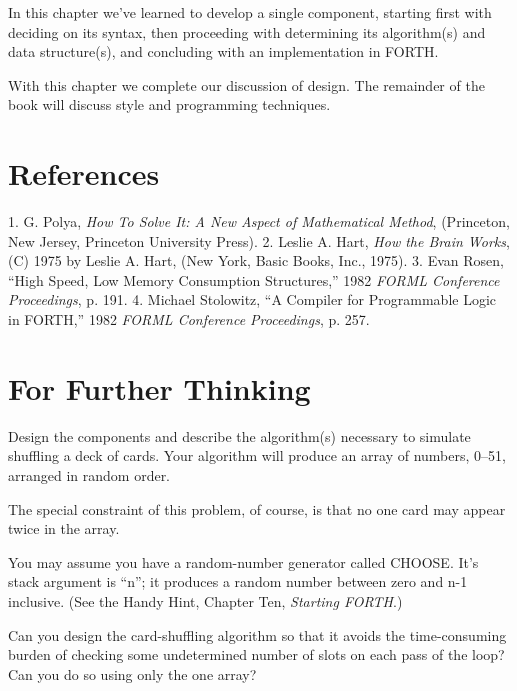 In this chapter we've learned to develop a single component, starting
first with deciding on its syntax, then proceeding with determining its
algorithm(s) and data structure(s), and concluding with an implementation
in FORTH.

With this chapter we complete our discussion of design. The remainder
of the book will discuss style and programming techniques.

\section{References}

1. G. Polya, \emph{How To Solve It: A New Aspect of Mathematical Method},
   (Princeton, New Jersey, Princeton University Press).
2. Leslie A. Hart, \emph{How the Brain Works}, (C) 1975 by Leslie A. Hart,
   (New York, Basic Books, Inc., 1975).
3. Evan Rosen, ``High Speed, Low Memory Consumption Structures,'' 1982
   \emph{FORML Conference Proceedings}, p. 191.
4. Michael Stolowitz, ``A Compiler for Programmable Logic in FORTH,'' 1982
   \emph{FORML Conference Proceedings}, p. 257.

\section{For Further Thinking}

Design the components and describe the algorithm(s) necessary to simulate
shuffling a deck of cards. Your algorithm will produce an array of
numbers, 0--51, arranged in random order.

The special constraint of this problem, of course, is that no one card
may appear twice in the array.

You may assume you have a random-number generator called
CHOOSE. It's stack argument is ``n''; it produces a random number
between zero and n-1 inclusive. (See the Handy Hint, Chapter Ten,
\emph{Starting FORTH}.)

Can you design the card-shuffling algorithm so that it avoids the
time-consuming burden of checking some undetermined number of slots
on each pass of the loop? Can you do so using only the one array?
